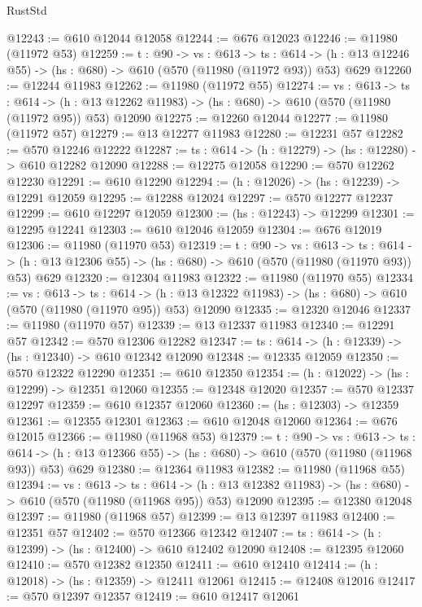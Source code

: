 \begin{lexlean}{RustStd}
\begin{coremodule}
@12243 := @610 @12044 @12058
@12244 := @676 @12023
@12246 := @11980 (@11972 @53)
@12259 := {t : @90} ->
  {vs : @613} ->
  {ts : @614} -> (h : @13 @12246 @55) -> (hs : @680) -> @610 (@570 (@11980 (@11972 @93)) @53) @629
@12260 := @12244 @11983
@12262 := @11980 (@11972 @55)
@12274 := {vs : @613} ->
  {ts : @614} ->
  (h : @13 @12262 @11983) -> (hs : @680) -> @610 (@570 (@11980 (@11972 @95)) @53) @12090
@12275 := @12260 @12044
@12277 := @11980 (@11972 @57)
@12279 := @13 @12277 @11983
@12280 := @12231 @57
@12282 := @570 @12246 @12222
@12287 := {ts : @614} -> (h : @12279) -> (hs : @12280) -> @610 @12282 @12090
@12288 := @12275 @12058
@12290 := @570 @12262 @12230
@12291 := @610 @12290
@12294 := (h : @12026) -> (hs : @12239) -> @12291 @12059
@12295 := @12288 @12024
@12297 := @570 @12277 @12237
@12299 := @610 @12297 @12059
@12300 := (hs : @12243) -> @12299
@12301 := @12295 @12241
@12303 := @610 @12046 @12059
@12304 := @676 @12019
@12306 := @11980 (@11970 @53)
@12319 := {t : @90} ->
  {vs : @613} ->
  {ts : @614} -> (h : @13 @12306 @55) -> (hs : @680) -> @610 (@570 (@11980 (@11970 @93)) @53) @629
@12320 := @12304 @11983
@12322 := @11980 (@11970 @55)
@12334 := {vs : @613} ->
  {ts : @614} ->
  (h : @13 @12322 @11983) -> (hs : @680) -> @610 (@570 (@11980 (@11970 @95)) @53) @12090
@12335 := @12320 @12046
@12337 := @11980 (@11970 @57)
@12339 := @13 @12337 @11983
@12340 := @12291 @57
@12342 := @570 @12306 @12282
@12347 := {ts : @614} -> (h : @12339) -> (hs : @12340) -> @610 @12342 @12090
@12348 := @12335 @12059
@12350 := @570 @12322 @12290
@12351 := @610 @12350
@12354 := (h : @12022) -> (hs : @12299) -> @12351 @12060
@12355 := @12348 @12020
@12357 := @570 @12337 @12297
@12359 := @610 @12357 @12060
@12360 := (hs : @12303) -> @12359
@12361 := @12355 @12301
@12363 := @610 @12048 @12060
@12364 := @676 @12015
@12366 := @11980 (@11968 @53)
@12379 := {t : @90} ->
  {vs : @613} ->
  {ts : @614} -> (h : @13 @12366 @55) -> (hs : @680) -> @610 (@570 (@11980 (@11968 @93)) @53) @629
@12380 := @12364 @11983
@12382 := @11980 (@11968 @55)
@12394 := {vs : @613} ->
  {ts : @614} ->
  (h : @13 @12382 @11983) -> (hs : @680) -> @610 (@570 (@11980 (@11968 @95)) @53) @12090
@12395 := @12380 @12048
@12397 := @11980 (@11968 @57)
@12399 := @13 @12397 @11983
@12400 := @12351 @57
@12402 := @570 @12366 @12342
@12407 := {ts : @614} -> (h : @12399) -> (hs : @12400) -> @610 @12402 @12090
@12408 := @12395 @12060
@12410 := @570 @12382 @12350
@12411 := @610 @12410
@12414 := (h : @12018) -> (hs : @12359) -> @12411 @12061
@12415 := @12408 @12016
@12417 := @570 @12397 @12357
@12419 := @610 @12417 @12061

\end{coremodule}
\end{lexlean}
